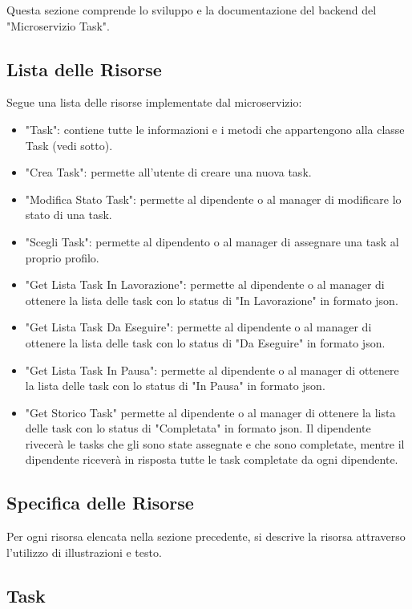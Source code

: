 \documentclass{report}
\begin{document}
Questa sezione comprende lo sviluppo e la documentazione del backend del
"Microservizio Task". 

\subsection{Lista delle Risorse}

Segue una lista delle risorse implementate dal microservizio:
\begin{itemize}
	\item "Task": contiene tutte le informazioni e i metodi che appartengono alla classe Task (vedi sotto).
	\item "Crea Task": permette all'utente di creare una nuova task.
	\item "Modifica Stato Task": permette al dipendente o al manager di modificare lo stato di una task.
	\item "Scegli Task": permette al dipendento o al manager di assegnare una task al proprio profilo.
	\item "Get Lista Task In Lavorazione": permette al dipendente o al manager di ottenere la lista delle task con lo status di "In Lavorazione" in formato json.
	\item "Get Lista Task Da Eseguire": permette al dipendente o al manager di ottenere la lista delle task con lo status di "Da Eseguire" in formato json.
	\item "Get Lista Task In Pausa": permette al dipendente o al manager di ottenere la lista delle task con lo status di "In Pausa" in formato json.
	\item "Get Storico Task" permette al dipendente o al manager di ottenere la lista delle task con lo status di "Completata" in formato json. Il dipendente rivecerà le tasks che gli sono state assegnate e che sono completate, mentre il dipendente riceverà in risposta tutte le task completate da ogni dipendente.
\end{itemize}

\subsection{Specifica delle Risorse}

Per ogni risorsa elencata nella sezione precedente, si descrive la risorsa attraverso l'utilizzo di illustrazioni e testo.

\subsection*{Task}
\end{document}
